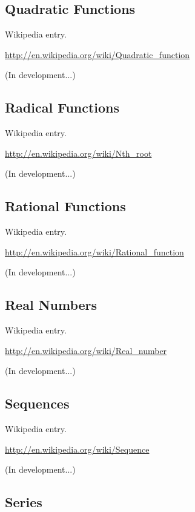 \documentclass[12pt,oneside]{book}
\begin{document}
\subsection[Quadratic Functions]{Quadratic Functions}

Wikipedia entry.

\href{http://en.wikipedia.org/wiki/Quadratic_function}{http://en.wikipedia.org/wiki/Quadratic\_function}

(In development...)

\subsection[Radical Functions]{Radical Functions}

Wikipedia entry.

\href{http://en.wikipedia.org/wiki/Nth_root}{http://en.wikipedia.org/wiki/Nth\_root}

(In development...)

\subsection[Rational Functions]{Rational Functions}

Wikipedia entry.

\href{http://en.wikipedia.org/wiki/Rational_function}{http://en.wikipedia.org/wiki/Rational\_function}

(In development...)

\subsection[Real Numbers]{Real Numbers}

Wikipedia entry.

\href{http://en.wikipedia.org/wiki/Real_number}{http://en.wikipedia.org/wiki/Real\_number}

(In development...)

\subsection[Sequences]{Sequences}

Wikipedia entry.

\href{http://en.wikipedia.org/wiki/Sequence}{http://en.wikipedia.org/wiki/Sequence}

(In development...)

\subsection[Series]{Series}
\end{document}
